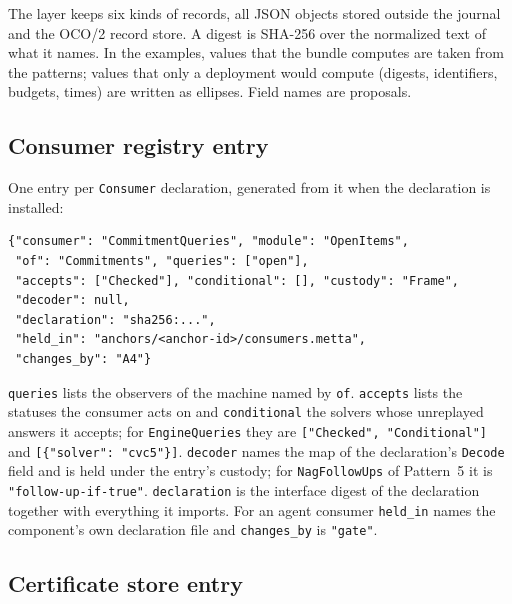 \documentclass[11pt]{article}
\newcommand{\code}[1]{\texttt{#1}}
\theoremstyle{definition}
\theoremstyle{plain}
\begin{document}
The layer keeps six kinds of records, all JSON objects stored outside the journal and the OCO/2
record store. A digest is SHA-256 over the normalized text of what it names. In the examples,
values that the bundle computes are taken from the patterns; values that only a deployment would
compute (digests, identifiers, budgets, times) are written as ellipses. Field names are proposals.

\subsection{Consumer registry entry}

One entry per \code{Consumer} declaration, generated from it when the declaration is installed:
\begin{lstlisting}
{"consumer": "CommitmentQueries", "module": "OpenItems",
 "of": "Commitments", "queries": ["open"],
 "accepts": ["Checked"], "conditional": [], "custody": "Frame",
 "decoder": null,
 "declaration": "sha256:...",
 "held_in": "anchors/<anchor-id>/consumers.metta",
 "changes_by": "A4"}
\end{lstlisting}
\code{queries} lists the observers of the machine named by \code{of}. \code{accepts} lists the
statuses the consumer acts on and \code{conditional} the solvers whose unreplayed answers it
accepts; for \code{EngineQueries} they are \code{["Checked", "Conditional"]} and
\code{[\{"solver": "cvc5"\}]}. \code{decoder} names the map of the declaration's \code{Decode}
field and is held under the entry's custody; for \code{NagFollowUps} of Pattern~5 it is
\code{"follow-up-if-true"}. \code{declaration} is the interface digest of the declaration together
with everything it imports. For an agent consumer \code{held\_in} names the component's own
declaration file and \code{changes\_by} is \code{"gate"}.

\subsection{Certificate store entry}\label{app:store}
\end{document}
